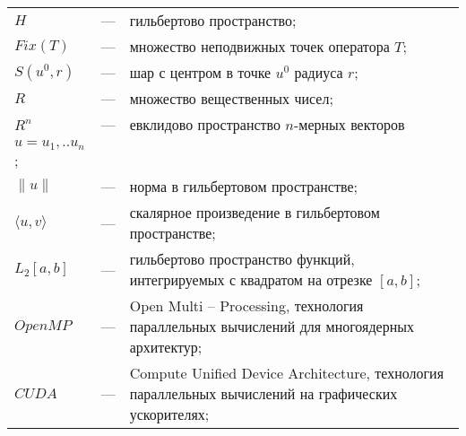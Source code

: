 
\begin{longtable}{lp{}p{}}
	
$H$ & --- & гильбертово пространство;\\

$Fix(T)$ & --- & множество неподвижных точек оператора $T$;\\

$S(u^0, r)$ & --- & шар с центром в точке $u^0$ радиуса $r$;\\

$R$ & --- & множество вещественных чисел;\\

$R^n$ & --- & евклидово пространство $n$-мерных векторов \\ $u=u_1,..u_n$;\\

$\|u\|$ & --- & норма в гильбертовом пространстве;\\

$\langle u, v\rangle$ & --- & скалярное произведение в гильбертовом пространстве;\\

$L_2[a, b]$ & --- & гильбертово пространство функций, интегрируемых с квадратом на отрезке $[a, b]$;\\

$OpenMP$ & --- & Open Multi -- Processing, технология параллельных вычислений для многоядерных архитектур;\\

$CUDA$ & --- & Compute Unified Device Architecture, технология параллельных вычислений на графических ускорителях;\\

\end{longtable}

